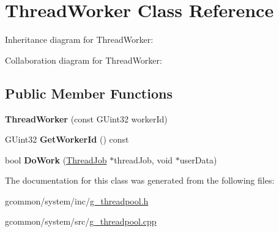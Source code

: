\hypertarget{class_thread_worker}{\section{Thread\-Worker Class Reference}
\label{class_thread_worker}
}


Inheritance diagram for Thread\-Worker\-:


Collaboration diagram for Thread\-Worker\-:
\subsection*{Public Member Functions}
\begin{DoxyCompactItemize}
\item 
\hypertarget{class_thread_worker_aab0b03ce7564a625cc37b091be3eddcd}{{\bfseries Thread\-Worker} (const G\-Uint32 worker\-Id)}\label{class_thread_worker_aab0b03ce7564a625cc37b091be3eddcd}

\item 
\hypertarget{class_thread_worker_a008e0fb55e47ee36f25efee152b51211}{G\-Uint32 {\bfseries Get\-Worker\-Id} () const }\label{class_thread_worker_a008e0fb55e47ee36f25efee152b51211}

\item 
\hypertarget{class_thread_worker_a536e41e074c1bbe685d5d32a7a17b714}{bool {\bfseries Do\-Work} (\hyperlink{class_thread_job}{Thread\-Job} $\ast$thread\-Job, void $\ast$user\-Data)}\label{class_thread_worker_a536e41e074c1bbe685d5d32a7a17b714}

\end{DoxyCompactItemize}


The documentation for this class was generated from the following files\-:\begin{DoxyCompactItemize}
\item 
gcommon/system/inc/\hyperlink{g__threadpool_8h}{g\-\_\-threadpool.\-h}\item 
gcommon/system/src/\hyperlink{g__threadpool_8cpp}{g\-\_\-threadpool.\-cpp}\end{DoxyCompactItemize}
